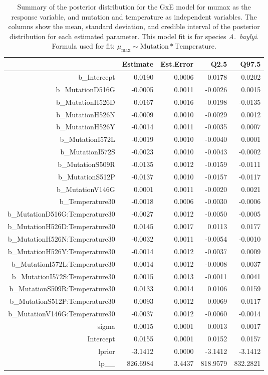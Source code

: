 \begin{table}[ht]
\centering
\begin{tabular}{rrrrr}
  \hline
 & Estimate & Est.Error & Q2.5 & Q97.5 \\ 
  \hline
b\_Intercept & 0.0190 & 0.0006 & 0.0178 & 0.0202 \\ 
  b\_MutationD516G & -0.0005 & 0.0011 & -0.0026 & 0.0015 \\ 
  b\_MutationH526D & -0.0167 & 0.0016 & -0.0198 & -0.0135 \\ 
  b\_MutationH526N & -0.0009 & 0.0010 & -0.0029 & 0.0012 \\ 
  b\_MutationH526Y & -0.0014 & 0.0011 & -0.0035 & 0.0007 \\ 
  b\_MutationI572L & -0.0019 & 0.0010 & -0.0040 & 0.0001 \\ 
  b\_MutationI572S & -0.0023 & 0.0010 & -0.0043 & -0.0002 \\ 
  b\_MutationS509R & -0.0135 & 0.0012 & -0.0159 & -0.0111 \\ 
  b\_MutationS512P & -0.0137 & 0.0010 & -0.0157 & -0.0117 \\ 
  b\_MutationV146G & 0.0001 & 0.0011 & -0.0020 & 0.0021 \\ 
  b\_Temperature30 & -0.0018 & 0.0006 & -0.0030 & -0.0006 \\ 
  b\_MutationD516G:Temperature30 & -0.0027 & 0.0012 & -0.0050 & -0.0005 \\ 
  b\_MutationH526D:Temperature30 & 0.0145 & 0.0017 & 0.0113 & 0.0177 \\ 
  b\_MutationH526N:Temperature30 & -0.0032 & 0.0011 & -0.0054 & -0.0010 \\ 
  b\_MutationH526Y:Temperature30 & -0.0014 & 0.0012 & -0.0037 & 0.0009 \\ 
  b\_MutationI572L:Temperature30 & 0.0014 & 0.0012 & -0.0008 & 0.0037 \\ 
  b\_MutationI572S:Temperature30 & 0.0015 & 0.0013 & -0.0011 & 0.0041 \\ 
  b\_MutationS509R:Temperature30 & 0.0133 & 0.0014 & 0.0106 & 0.0159 \\ 
  b\_MutationS512P:Temperature30 & 0.0093 & 0.0012 & 0.0069 & 0.0117 \\ 
  b\_MutationV146G:Temperature30 & -0.0037 & 0.0012 & -0.0060 & -0.0014 \\ 
  sigma & 0.0015 & 0.0001 & 0.0013 & 0.0017 \\ 
  Intercept & 0.0155 & 0.0001 & 0.0152 & 0.0157 \\ 
  lprior & -3.1412 & 0.0000 & -3.1412 & -3.1412 \\ 
  lp\_\_ & 826.6984 & 3.4437 & 818.9579 & 832.2821 \\ 
   \hline
\end{tabular}
\caption{Summary of the posterior distribution for the GxE model for mumax as the response variable, and mutation and temperature as independent variables. The columns show the mean, standard deviation, and credible interval of the posterior distribution for each estimated parameter. This model fit is for species \textit{A.~baylyi}.  Formula used for fit: $\mu_{\text{max}} \sim \text{Mutation} * \text{Temperature}$.} 
\label{supptab:GxE_mumax_Abaylyi}
\end{table}



